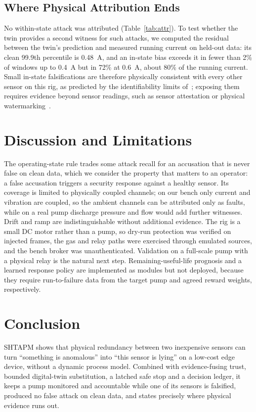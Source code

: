 \documentclass[conference]{IEEEtran}
\begin{document}
\subsection{Where Physical Attribution Ends}

No within-state attack was attributed (Table~\ref{tab:attr}). To test whether the twin provides a second witness for such attacks, we computed the residual between the twin's prediction and measured running current on held-out data: its clean 99.9th percentile is 0.48~A, and an in-state bias exceeds it in fewer than 2\% of windows up to 0.4~A but in 72\% at 0.6~A, about 80\% of the running current. Small in-state falsifications are therefore physically consistent with every other sensor on this rig, as predicted by the identifiability limits of~\cite{pasqualetti2013identification}; exposing them requires evidence beyond sensor readings, such as sensor attestation or physical watermarking~\cite{mo2009replay}.

\section{Discussion and Limitations}

The operating-state rule trades some attack recall for an accusation that is never false on clean data, which we consider the property that matters to an operator: a false accusation triggers a security response against a healthy sensor. Its coverage is limited to physically coupled channels; on our bench only current and vibration are coupled, so the ambient channels can be attributed only as faults, while on a real pump discharge pressure and flow would add further witnesses. Drift and ramp are indistinguishable without additional evidence. The rig is a small DC motor rather than a pump, so dry-run protection was verified on injected frames, the gas and relay paths were exercised through emulated sources, and the bench broker was unauthenticated. Validation on a full-scale pump with a physical relay is the natural next step. Remaining-useful-life prognosis and a learned response policy are implemented as modules but not deployed, because they require run-to-failure data from the target pump and agreed reward weights, respectively.

\section{Conclusion}

SHTAPM shows that physical redundancy between two inexpensive sensors can turn ``something is anomalous'' into ``this sensor is lying'' on a low-cost edge device, without a dynamic process model. Combined with evidence-fusing trust, bounded digital-twin substitution, a latched safe stop and a decision ledger, it keeps a pump monitored and accountable while one of its sensors is falsified, produced no false attack on clean data, and states precisely where physical evidence runs out.
\end{document}
